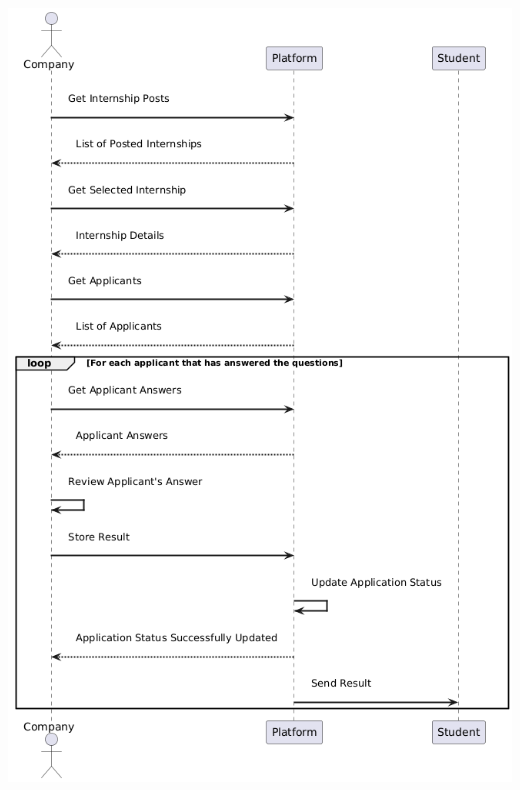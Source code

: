 \begin{center}
    \includegraphics[scale = 0.8]{Images/ImagesRASD/Company_questions_reviewing.png}
\end{center}

\newpage

